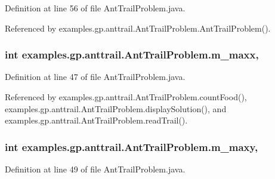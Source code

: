 Definition at line 56 of file Ant\-Trail\-Problem.\-java.



Referenced by examples.\-gp.\-anttrail.\-Ant\-Trail\-Problem.\-Ant\-Trail\-Problem().

\hypertarget{classexamples_1_1gp_1_1anttrail_1_1_ant_trail_problem_a1456ecc3548fba0c0843f20a0abbb107}{
\subsubsection[{m\-\_\-maxx}]{\setlength{\rightskip}{0pt plus 5cm}int examples.\-gp.\-anttrail.\-Ant\-Trail\-Problem.\-m\-\_\-maxx\hspace{0.3cm}{\ttfamily [static]}, {\ttfamily [private]}}}\label{classexamples_1_1gp_1_1anttrail_1_1_ant_trail_problem_a1456ecc3548fba0c0843f20a0abbb107}


Definition at line 47 of file Ant\-Trail\-Problem.\-java.



Referenced by examples.\-gp.\-anttrail.\-Ant\-Trail\-Problem.\-count\-Food(), examples.\-gp.\-anttrail.\-Ant\-Trail\-Problem.\-display\-Solution(), and examples.\-gp.\-anttrail.\-Ant\-Trail\-Problem.\-read\-Trail().

\hypertarget{classexamples_1_1gp_1_1anttrail_1_1_ant_trail_problem_a0c1ac1295239c03087ee11ca6bcbd9f9}{
\subsubsection[{m\-\_\-maxy}]{\setlength{\rightskip}{0pt plus 5cm}int examples.\-gp.\-anttrail.\-Ant\-Trail\-Problem.\-m\-\_\-maxy\hspace{0.3cm}{\ttfamily [static]}, {\ttfamily [private]}}}\label{classexamples_1_1gp_1_1anttrail_1_1_ant_trail_problem_a0c1ac1295239c03087ee11ca6bcbd9f9}


Definition at line 49 of file Ant\-Trail\-Problem.\-java.



